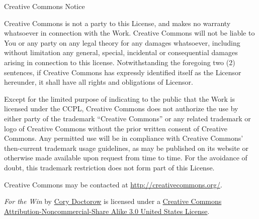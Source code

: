 Creative Commons Notice

Creative Commons is not a party to this License, and makes no
warranty whatsoever in connection with the Work. Creative Commons
will not be liable to You or any party on any legal theory for any
damages whatsoever, including without limitation any general,
special, incidental or consequential damages arising in connection
to this license. Notwithstanding the foregoing two (2) sentences,
if Creative Commons has expressly identified itself as the Licensor
hereunder, it shall have all rights and obligations of Licensor.

Except for the limited purpose of indicating to the public that the
Work is licensed under the CCPL, Creative Commons does not
authorize the use by either party of the trademark ``Creative
Commons'' or any related trademark or logo of Creative Commons
without the prior written consent of Creative Commons. Any
permitted use will be in compliance with Creative Commons'
then-current trademark usage guidelines, as may be published on its
website or otherwise made available upon request from time to time.
For the avoidance of doubt, this trademark restriction does not
form part of this License.

Creative Commons may be contacted at
\url{http://creativecommons.org/}.

\textit{For the Win} by
\href{http://craphound.com/ftw}{Cory Doctorow}
is licensed under a
\href{http://creativecommons.org/licenses/by-nc-sa/3.0/us/}{Creative Commons Attribution-Noncommercial-Share Alike 3.0 United States License}.


